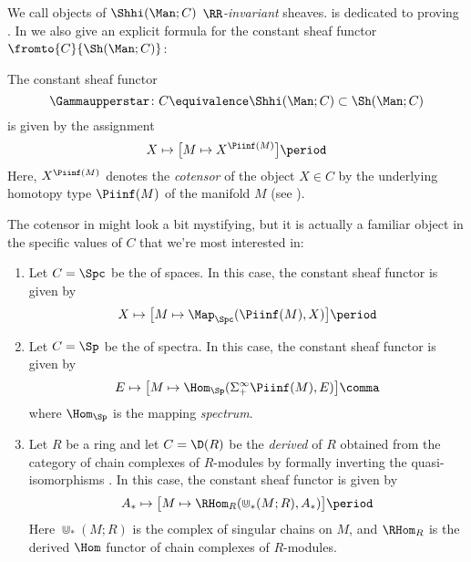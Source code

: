 We call objects of $ \Shhi(\Man;C) $ \textit{$ \RR $-invariant} sheaves.
 is dedicated to proving . 
In  we also give an explicit formula for the constant sheaf functor $ \fromto{C}{\Sh(\Man;C)} $:

\begin{proposition}\label{introprop:constantishi}
	The constant sheaf functor 
	\begin{equation*}
		\Gammaupperstar \colon C \equivalence \Shhi(\Man;C) \subset \Sh(\Man;C)
	\end{equation*}
	is given by the assignment
	\begin{equation*}
		X \mapsto \big[M \mapsto X^{\Piinf(M)}\big] \period 
	\end{equation*}
	Here, $ X^{\Piinf(M)} $ denotes the \emph{cotensor} of the object $ X \in C $ by the underlying homotopy type $ \Piinf(M) $ of the manifold $ M $ (see ).
\end{proposition}

The cotensor in  might look a bit mystifying, but it is actually a familiar object in
the specific values of $ C $ that we're most interested in:
\begin{enumerate}[(1)]
	\item Let $ C = \Spc $ be the \category of spaces.
	In this case, the constant sheaf functor is given by
	\begin{equation*}
		X \mapsto \big[M \mapsto \Map_{\Spc}(\Piinf(M),X) \big] \period 
	\end{equation*}

	\item Let $ C = \Sp $ be the \category of spectra.
	In this case, the constant sheaf functor is given by
	\begin{equation*}
		E \mapsto \big[M \mapsto \Hom_{\Sp}(\Sigma_{+}^{\infty} \Piinf(M),E) \big] \comma 
	\end{equation*}
	where $ \Hom_{\Sp} $ is the mapping \textit{spectrum}.

	\item Let $ R $ be a ring and let $ C = \D(R) $ be the \textit{derived \category} of $ R $ obtained from the
	category of chain complexes of $ R $-modules by formally inverting the quasi-isomorphisms
	\cite[, , \& ]{HA}.
	In this case, the constant sheaf functor is given by
	\begin{equation*}
		A_{*} \mapsto \big[M \mapsto \RHom_{R}(\Cup_*(M;R),A_{*}) \big] \period 
	\end{equation*}
	Here $ \Cup_*(M;R) $ is the complex of singular chains on $ M $, and $ \RHom_{R} $ is the derived $ \Hom $
	functor of chain complexes of $ R $-modules.
\end{enumerate}

